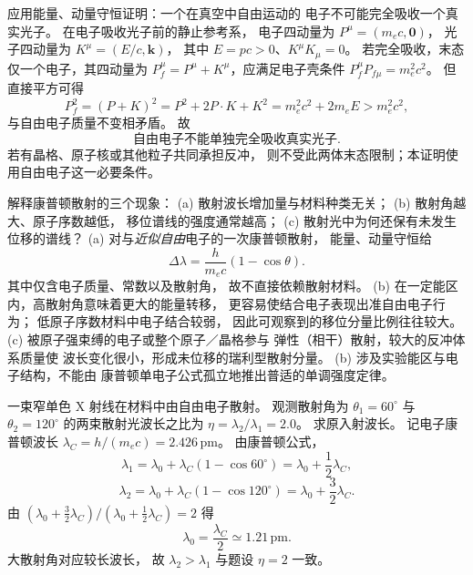 应用能量、动量守恒证明：一个在真空中自由运动的
电子不可能完全吸收一个真实光子。
\exsolution
在电子吸收光子前的静止参考系，
电子四动量为 $P^\mu=(m_ec,\boldsymbol0)$，
光子四动量为 $K^\mu=(E/c,\boldsymbol k)$，
其中 $E=pc>0$、$K^\mu K_\mu=0$。
若完全吸收，末态仅一个电子，其四动量为
$P_f^\mu=P^\mu+K^\mu$，应满足电子壳条件
$P_f^\mu P_{f\mu}=m_e^2c^2$。
但直接平方可得
\[
 P_f^2=(P+K)^2=P^2+2P\!\cdot\! K+K^2
 =m_e^2c^2+2m_eE>m_e^2c^2,
\]
与自由电子质量不变相矛盾。
故
\[
 \boxed{\text{自由电子不能单独完全吸收真实光子}}.
\]
\excheck 若有晶格、原子核或其他粒子共同承担反冲，
则不受此两体末态限制；本证明使用自由电子这一必要条件。

解释康普顿散射的三个现象：
(a) 散射波长增加量与材料种类无关；
(b) 散射角越大、原子序数越低，
移位谱线的强度通常越高；
(c) 散射光中为何还保有未发生位移的谱线？
\exsolution
(a) 对与\emph{近似自由}电子的一次康普顿散射，
能量、动量守恒给
\[
 \boxed{\Delta\lambda=
 \frac{h}{m_ec}(1-\cos\theta)}.
\]
其中仅含电子质量、常数以及散射角，
故不直接依赖散射材料。
(b) 在一定能区内，高散射角意味着更大的能量转移，
更容易使结合电子表现出准自由电子行为；
低原子序数材料中电子结合较弱，
因此可观察到的移位分量比例往往较大。
(c) 被原子强束缚的电子或整个原子／晶格参与
弹性（相干）散射，较大的反冲体系质量使
波长变化很小，形成未位移的瑞利型散射分量。
\excheck (b) 涉及实验能区与电子结构，不能由
康普顿单电子公式孤立地推出普适的单调强度定律。

一束窄单色 X 射线在材料中由自由电子散射。
观测散射角为
$\theta_1=60^\circ$ 与 $\theta_2=120^\circ$
的两束散射光波长之比为
$\eta=\lambda_2/\lambda_1=2.0$。
求原入射波长。
\exsolution
记电子康普顿波长
$\lambda_C=h/(m_ec)=2.426\,\mathrm{pm}$。
由康普顿公式，
\[
 \lambda_1=\lambda_0+\lambda_C(1-\cos60^\circ)
 =\lambda_0+\frac12\lambda_C,
\]
\[
 \lambda_2=\lambda_0+\lambda_C(1-\cos120^\circ)
 =\lambda_0+\frac32\lambda_C.
\]
由
$(\lambda_0+\tfrac32\lambda_C)/
(\lambda_0+\tfrac12\lambda_C)=2$
得
\[
 \boxed{\lambda_0=\frac{\lambda_C}{2}
 \simeq1.21\,\mathrm{pm}}.
\]
\excheck 大散射角对应较长波长，
故 $\lambda_2>\lambda_1$ 与题设 $\eta=2$ 一致。

